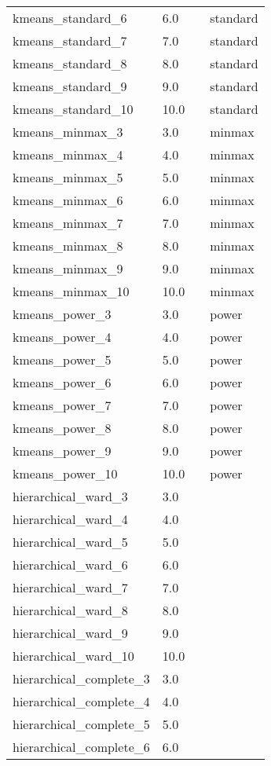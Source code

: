\begin{tabular}{llll}
kmeans\_standard\_6 & 6.0 &  & standard \\ 
kmeans\_standard\_7 & 7.0 &  & standard \\ 
kmeans\_standard\_8 & 8.0 &  & standard \\ 
kmeans\_standard\_9 & 9.0 &  & standard \\ 
kmeans\_standard\_10 & 10.0 &  & standard \\ 
kmeans\_minmax\_3 & 3.0 &  & minmax \\ 
kmeans\_minmax\_4 & 4.0 &  & minmax \\ 
kmeans\_minmax\_5 & 5.0 &  & minmax \\ 
kmeans\_minmax\_6 & 6.0 &  & minmax \\ 
kmeans\_minmax\_7 & 7.0 &  & minmax \\ 
kmeans\_minmax\_8 & 8.0 &  & minmax \\ 
kmeans\_minmax\_9 & 9.0 &  & minmax \\ 
kmeans\_minmax\_10 & 10.0 &  & minmax \\ 
kmeans\_power\_3 & 3.0 &  & power \\ 
kmeans\_power\_4 & 4.0 &  & power \\ 
kmeans\_power\_5 & 5.0 &  & power \\ 
kmeans\_power\_6 & 6.0 &  & power \\ 
kmeans\_power\_7 & 7.0 &  & power \\ 
kmeans\_power\_8 & 8.0 &  & power \\ 
kmeans\_power\_9 & 9.0 &  & power \\ 
kmeans\_power\_10 & 10.0 &  & power \\ 
hierarchical\_ward\_3 & 3.0 &  &  \\ 
hierarchical\_ward\_4 & 4.0 &  &  \\ 
hierarchical\_ward\_5 & 5.0 &  &  \\ 
hierarchical\_ward\_6 & 6.0 &  &  \\ 
hierarchical\_ward\_7 & 7.0 &  &  \\ 
hierarchical\_ward\_8 & 8.0 &  &  \\ 
hierarchical\_ward\_9 & 9.0 &  &  \\ 
hierarchical\_ward\_10 & 10.0 &  &  \\ 
hierarchical\_complete\_3 & 3.0 &  &  \\ 
hierarchical\_complete\_4 & 4.0 &  &  \\ 
hierarchical\_complete\_5 & 5.0 &  &  \\ 
hierarchical\_complete\_6 & 6.0 &  &  \\ 

\end{tabular}
